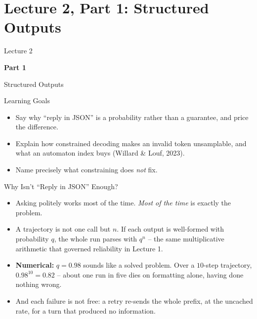 \section{Lecture 2, Part 1: Structured Outputs}

\begin{frame}
\vfill
\centering
{\color{RLBlue}\large Lecture 2}

\vspace{0.3em}
{\color{RLBlue}\Large\bfseries Part 1}

\vspace{0.6em}
{\Large Structured Outputs}
\vfill
\end{frame}

\begin{frame}{Learning Goals}
\begin{itemize}
  \item Say why ``reply in JSON'' is a probability rather than a guarantee, and price the difference.
  \pause
  \item Explain how constrained decoding makes an invalid token unsamplable, and what an automaton index buys (Willard \& Louf, 2023).
  \pause
  \item Name precisely what constraining does \emph{not} fix.
\end{itemize}
\end{frame}

\begin{frame}{Why Isn't ``Reply in JSON'' Enough?}
\begin{itemize}
  \item Asking politely works most of the time. \emph{Most of the time} is exactly the problem.
  \pause
  \item A trajectory is not one call but $n$. If each output is well-formed with probability $q$, the whole run parses with $q^{n}$ -- the same multiplicative arithmetic that governed reliability in Lecture 1.
  \pause
  \item \textbf{Numerical:} $q = 0.98$ sounds like a solved problem. Over a $10$-step trajectory, $0.98^{10} = 0.82$ -- about one run in five dies on formatting alone, having done nothing wrong.
  \pause
  \item And each failure is not free: a retry re-sends the whole prefix, at the uncached rate, for a turn that produced no information.
\end{itemize}
\end{frame}

